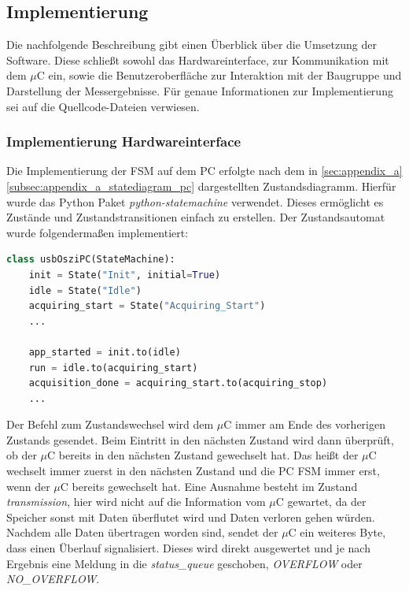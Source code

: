 \documentclass[a4paper, portrait, 12pt]{scrartcl} %
\begin{document}
\pagebreak
\subsection{Implementierung}
Die nachfolgende Beschreibung gibt einen Überblick über die Umsetzung der Software. Diese schließt sowohl das Hardwareinterface, zur Kommunikation mit dem $\mu$C ein, sowie die Benutzeroberfläche zur Interaktion mit der Baugruppe und Darstellung der Messergebnisse. Für genaue Informationen zur Implementierung sei auf die Quellcode-Dateien verwiesen.

\subsubsection{Implementierung Hardwareinterface}
Die Implementierung der FSM auf dem PC erfolgte nach dem in \autoref{sec:appendix_a} \autoref{subsec:appendix_a_statediagram_pc} dargestellten Zustandsdiagramm. Hierfür wurde das Python Paket \emph{python-statemachine} verwendet. Dieses ermöglicht es Zustände und Zustandstransitionen einfach zu erstellen. Der Zustandsautomat wurde folgendermaßen implementiert:

\begin{lstlisting}[language=Python, caption={Implementierung der Zustandsmaschine \texttt{usbOsziPC} in Python}]
class usbOsziPC(StateMachine):
    init = State("Init", initial=True)
    idle = State("Idle")
    acquiring_start = State("Acquiring_Start")
    ...

    app_started = init.to(idle)
    run = idle.to(acquiring_start)
    acquisition_done = acquiring_start.to(acquiring_stop)
   	...
\end{lstlisting}

Der Befehl zum Zustandswechsel wird dem $\mu$C immer am Ende des vorherigen Zustands gesendet. Beim Eintritt in den nächsten Zustand wird dann überprüft, ob der $\mu$C bereits in den nächsten Zustand gewechselt hat. Das heißt der $\mu$C wechselt immer zuerst in den nächsten Zustand und die PC FSM immer erst, wenn der $\mu$C bereits gewechselt hat. Eine Ausnahme besteht im Zustand \emph{transmission}, hier wird nicht auf die Information vom $\mu$C gewartet, da der Speicher sonst mit Daten überflutet wird und Daten verloren gehen würden.\\

Nachdem alle Daten übertragen worden sind, sendet der $\mu$C ein weiteres Byte, dass einen Überlauf signalisiert. Dieses wird direkt ausgewertet und je nach Ergebnis eine Meldung in die \emph{status\_queue} geschoben, \emph{OVERFLOW} oder \emph{NO\_OVERFLOW}.
\end{document}
